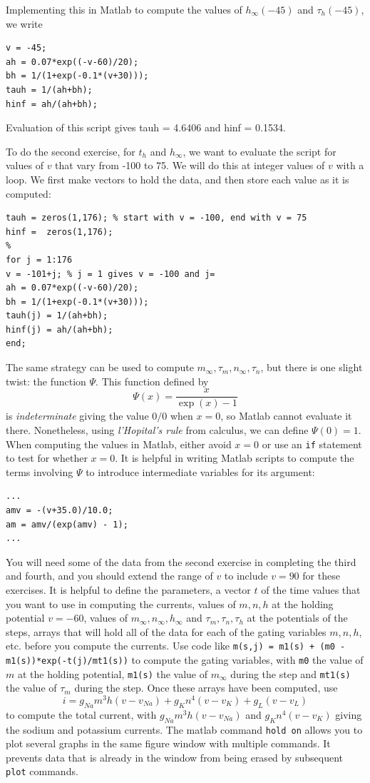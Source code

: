 \documentclass [11pt]{article}
\newcounter{exercise}
\numberwithin{exercise}{section}
\begin{document}
Implementing this in Matlab to compute the values of $h_{\infty}(-45)$ and
$\tau_h(-45)$, we write
\begin{verbatim}
v = -45;
ah = 0.07*exp((-v-60)/20);
bh = 1/(1+exp(-0.1*(v+30)));
tauh = 1/(ah+bh);
hinf = ah/(ah+bh);
\end{verbatim}
Evaluation of this script gives tauh = 4.6406 and hinf = 0.1534.

To do the second exercise, for $t_h$ and $h_\infty$, we want to evaluate the script
for values of $v$ that vary from -100 to 75. We will do this at integer
values of $v$ with a loop. We first make vectors to hold the data, and then store 
each value as it is computed:
\begin{verbatim}
tauh = zeros(1,176); % start with v = -100, end with v = 75
hinf =  zeros(1,176);
%
for j = 1:176
v = -101+j; % j = 1 gives v = -100 and j= 
ah = 0.07*exp((-v-60)/20);
bh = 1/(1+exp(-0.1*(v+30)));
tauh(j) = 1/(ah+bh);
hinf(j) = ah/(ah+bh);
end;
\end{verbatim}

The same strategy can be used to compute $m_\infty,\tau_m,n_\infty,\tau_n$, but 
there is one slight twist: the function $\Psi$. This function defined by 
$$\Psi(x) = \frac{x}{\exp(x) - 1}$$ is 
{\it indeterminate} giving the value $0/0$ when $x=0$, so Matlab cannot evaluate
it there. Nonetheless, using {\it l'Hopital's rule} from calculus, we can
define $\Psi(0) = 1$. When computing the values in Matlab, either avoid $x=0$
or use an \texttt{if} statement to test for whether $x=0$. It is helpful
in writing Matlab scripts to compute the terms involving $\Psi$ to introduce
intermediate variables for its argument:
\begin{verbatim}
...
amv = -(v+35.0)/10.0;
am = amv/(exp(amv) - 1);
...
\end{verbatim} 

You will need some of the data from the second exercise in completing the third 
and fourth, and you should extend the 
range of $v$ to include $v=90$ for these exercises. It is helpful to define 
the parameters, a vector $t$ of the time values that you want to use in 
computing the currents, values of $m,n,h$ at the holding 
potential $v=-60$, values of $m_\infty,n_\infty,h_\infty$ and 
$\tau_m,\tau_n,\tau_h$ at the potentials of the steps, arrays that will 
hold all of the data for each of the gating variables
$m,n,h$, etc. before you compute the currents. 
Use code like 
\texttt{m(s,j) = m1(s) + (m0 - m1(s))*exp(-t(j)/mt1(s))}
to compute the gating variables, with \texttt{m0} the value of $m$ at the holding
potential, \texttt{m1(s)} the value of  $m_\infty$ during the step and 
\texttt{mt1(s)} the value of  $\tau_m$ during the step.
Once these arrays have been computed, use 
$$i = g_{Na}m^3h(v-v_{Na}) + g_Kn^4(v-v_K) + g_L(v-v_L)$$
to compute the total current, with $g_{Na}m^3h(v-v_{Na})$ and $g_Kn^4(v-v_K)$
giving the sodium and potassium currents.
The matlab command \texttt{hold on} allows you to plot several graphs in the
same figure window with multiple commands. It prevents data that is already 
in the window from being erased by subsequent \texttt{plot} commands.
\end{document}
